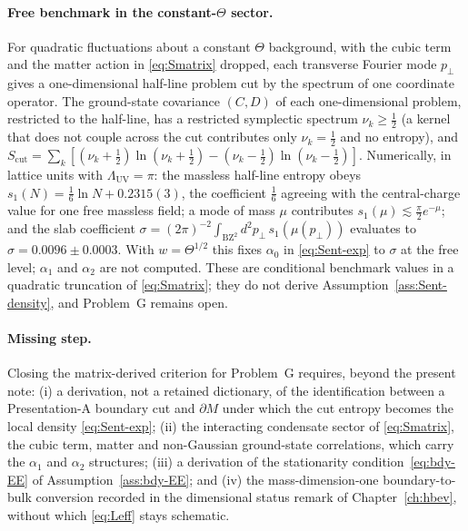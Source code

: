 \paragraph{Free benchmark in the constant-\(\Theta\) sector.}
For quadratic fluctuations about a constant \(\Theta\) background, with the
cubic term and the matter action in \eqref{eq:Smatrix} dropped, each transverse
Fourier mode \(p_\perp\) gives a one-dimensional half-line problem cut by the
spectrum of one coordinate operator. The ground-state covariance \((C,D)\) of
each one-dimensional problem, restricted to the half-line, has a restricted
symplectic spectrum \(\nu_k\ge\tfrac12\) (a kernel that does not couple across
the cut contributes only \(\nu_k=\tfrac12\) and no entropy), and
\(S_{\mathrm{cut}}=\sum_k[(\nu_k+\tfrac12)\ln(\nu_k+\tfrac12)-(\nu_k-\tfrac12)\ln(\nu_k-\tfrac12)]\).
Numerically, in lattice units with \(\Lambda_{\mathrm{UV}}=\pi\): the massless
half-line entropy obeys \(s_1(N)=\tfrac16\ln N+0.2315(3)\), the coefficient
\(\tfrac16\) agreeing with the central-charge value for one free massless
field; a mode of mass \(\mu\) contributes \(s_1(\mu)\lesssim\tfrac\pi2 e^{-\mu}\);
and the slab coefficient
\(\sigma=(2\pi)^{-2}\int_{\mathrm{BZ}^2}d^2p_\perp\,s_1(\mu(p_\perp))\)
evaluates to \(\sigma=0.0096\pm0.0003\). With \(w=\Theta^{1/2}\) this fixes
\(\alpha_0\) in \eqref{eq:Sent-exp} to \(\sigma\) at the free level;
\(\alpha_1\) and \(\alpha_2\) are not computed. These are conditional
benchmark values in a quadratic truncation of \eqref{eq:Smatrix}; they do not
derive Assumption~\ref{ass:Sent-density}, and Problem~G remains open.

\paragraph{Missing step.}
Closing the matrix-derived criterion for Problem~G requires, beyond the
present note: (i) a derivation, not a retained dictionary, of the
identification between a Presentation-A boundary cut and \(\partial M\) under
which the cut entropy becomes the local density \eqref{eq:Sent-exp}; (ii) the
interacting condensate sector of \eqref{eq:Smatrix}, the cubic term, matter
and non-Gaussian ground-state correlations, which carry the \(\alpha_1\) and
\(\alpha_2\) structures; (iii) a derivation of the stationarity
condition~\eqref{eq:bdy-EE} of Assumption~\ref{ass:bdy-EE}; and (iv) the
mass-dimension-one boundary-to-bulk conversion recorded in the dimensional
status remark of Chapter~\ref{ch:hbev}, without which \eqref{eq:Leff} stays
schematic.
